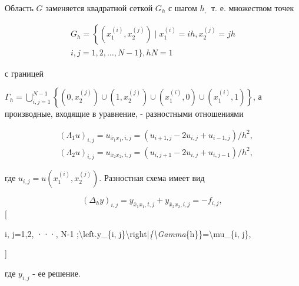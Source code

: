 \documentclass[10pt]{article}
\begin{document}
Область $G$ заменяется квадратной сеткой $G_{h}$ с шагом $h_{\text {, }}$ т. е. множеством точек



\[

\begin{gathered}

G_{h}=\left\{\left(x_{1}^{(i)}, x_{2}^{(j)}\right) \mid x_{1}^{(i)}=i h, x_{2}^{(j)}=j h\right. \\

i, j=1,2, \ldots, N-1\}, h N=1

\end{gathered}

\]



с границей



$\Gamma_{h}=\bigcup_{i, j=1}^{N-1}\left\{\left(0, x_{2}^{(j)}\right) \cup\left(1, x_{2}^{(j)}\right) \cup\left(x_{1}^{(i)}, 0\right) \cup\left(x_{1}^{(i)}, 1\right)\right\}$, а производные, входящие в уравнение, - разностными отношениями



\[

\begin{aligned}

& \left(\Lambda_{1} u\right)_{i, j}=u_{\bar{x}_{1} x_{1}, i, j}=\left(u_{i+1, j}-2 u_{i, j}+u_{i-1, j}\right) / h^{2}, \\

& \left(\Lambda_{2} u\right)_{i, j}=u_{\bar{x}_{2} x_{2}, i, j}=\left(u_{i, j+1}-2 u_{i, j}+u_{i, j-1}\right) / h^{2},

\end{aligned}

\]



где $u_{i, j}=u\left(x_{1}^{(i)}, x_{2}^{(j)}\right)$. Разностная схема имеет вид



\[

\left(\Delta_{h} y\right)_{i, j}=y_{\bar{x}_{1} x_{1}, t, j}+y_{\bar{x}_{2} x_{2}, i, j}=-f_{i, j} \text {, }

\][



i, j=1,2, ···, N-1 ;\textbackslash left.y\_\{i, j\}\textbackslash right|\textit{\{\textbackslash Gamma}\{h\}\}=\textbackslash mu\_\{i, j\},

]



где $y_{i, j}$ - ее решение.
\end{document}
